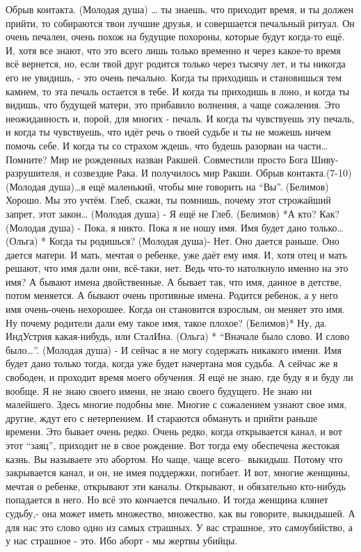 Обрыв контакта.
(Молодая душа) … ты знаешь, что приходит время, и ты должен прийти, то собираются твои лучшие друзья, и совершается печальный ритуал. Он очень печален, очень похож на будущие похороны, которые будут когда-то ещё. И, хотя все знают, что это всего лишь  только временно и через какое-то время всё вернется, но, если твой друг родится только через тысячу лет, и ты никогда его не увидишь, - это очень печально. Когда ты приходишь и становишься тем камнем, то эта печаль остается в тебе. И когда ты приходишь в лоно, и когда ты видишь, что будущей матери, это прибавило волнения, а чаще сожаления. Это неожиданность и, порой, для многих - печаль. И когда ты чувствуешь эту печаль, и когда ты чувствуешь, что идёт речь о твоей судьбе и ты не можешь ничем помочь себе. И когда ты со страхом ждешь, что будешь разорван на части… Помните? Мир не рожденных назван Ракшей. Совместили просто Бога Шиву- разрушителя, и созвездие Рака. И получилось мир Ракши.
Обрыв контакта.(7-10)
(Молодая душа)…я ещё маленький, чтобы мне говорить на ``Вы''.
(Белимов) Хорошо. Мы это учтём. Глеб, скажи, ты помнишь, почему этот строжайший запрет, этот закон…
(Молодая душа) - Я ещё не Глеб.
(Белимов) *А кто? Как?
(Молодая душа) - Пока, я никто. Пока я не ношу имя. Имя будет дано только…
(Ольга) * Когда ты родишься?
(Молодая душа)- Нет. Оно дается раньше.  Оно дается матери. И мать, мечтая о ребенке, уже даёт ему имя. И, хотя отец и мать решают, что имя дали они, всё-таки, нет. Ведь что-то натолкнуло именно на это имя? А бывают имена двойственные. А бывает так, что имя, данное в детстве, потом меняется. А бывают очень противные имена. Родится ребенок, а у него имя очень-очень нехорошее. Когда он становится взрослым, он меняет это имя. Ну почему родители дали ему такое имя, такое плохое?
(Белимов)* Ну,  да. ИндУстрия какая-нибудь, или СталИна.
(Ольга) * ``Вначале было слово.  И слово было…''.
(Молодая душа) - И сейчас я не могу содержать никакого имени. Имя будет дано только тогда, когда уже будет начертана моя судьба. А сейчас же  я свободен, и проходит время моего обучения. Я ещё не знаю, где буду я и буду ли вообще. Я не знаю своего имени, не знаю своего будущего. Не знаю ни малейшего. Здесь многие подобны мне. Многие с сожалением узнают свое имя, другие, ждут его с нетерпением. И стараются обмануть и прийти раньше времени. Это бывает очень редко. Очень редко, когда открывается канал, и вот этот ``заяц'', приходит не в свое рождение. Вот тогда ему обеспечена жестокая казнь. Вы называете это абортом. Но чаще, чаще всего– выкидыш.  Потому что закрывается канал, и он, не имея поддержки, погибает. И вот, многие женщины, мечтая о ребенке, открывают эти каналы. Открывают, и обязательно кто-нибудь попадается в него. Но всё это кончается печально. И тогда женщина клянет судьбу,- она может иметь множество, множество, как вы говорите, выкидышей. А для нас это слово одно из самых страшных. У вас  страшное, это самоубийство, а у нас страшное - это. Ибо аборт - мы жертвы убийцы.
